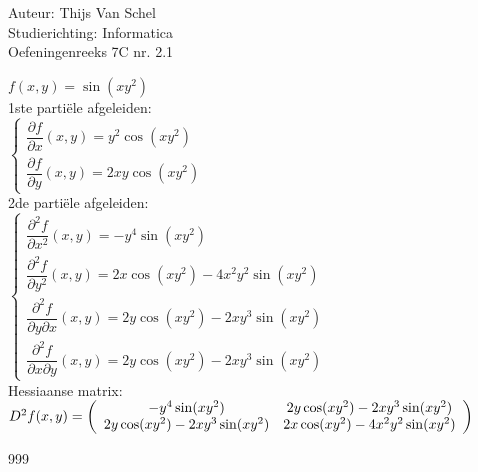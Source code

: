 \documentclass[a4paper]{article}
\begin{document}
  
\noindent \large Auteur: Thijs Van Schel \\
\noindent \large Studierichting: Informatica\\
\noindent \large Oefeningenreeks 7C nr. 2.1\\

\medskip

\normalsize

$f(x,y) = \sin(xy^2)$ \\

1ste partiële afgeleiden:\\

$\left\{ 
\begin{array}{l} 
\dfrac{\partial f}{\partial x}(x,y) = y^2 \cos(xy^2) \\ 
\dfrac{\partial f}{\partial y}(x,y) = 2xy \cos(xy^2) 
\end{array} 
\right.$ \\

2de partiële afgeleiden:\\

$\left\{ 
\begin{array}{l} 
\dfrac{\partial^2 f}{\partial x^2}(x,y) = -y^4 \sin(xy^2) \\ 
\dfrac{\partial^2 f}{\partial y^2}(x,y) = 2x \cos(xy^2) - 4x^2y^2 \sin(xy^2) \\
\dfrac{\partial^2 f}{\partial y \partial x}(x,y) = 2y \cos(xy^2) - 2xy^3 \sin(xy^2) \\
\dfrac{\partial^2 f}{\partial x \partial y}(x,y) = 2y \cos(xy^2) - 2xy^3 \sin(xy^2)
\end{array} 
\right.$ \\

Hessiaanse matrix:\\

$D^2f(x,y) = \left(\begin{array}{c c} -y^4 \sin(xy^2) & 2y \cos(xy^2) - 2xy^3 \sin(xy^2) \\ 2y \cos(xy^2) - 2xy^3 \sin(xy^2) & 2x \cos(xy^2) - 4x^2y^2 \sin(xy^2) \end{array}\right)$ \\

\begin{thebibliography}{999}
\end{thebibliography}
\end{document}
